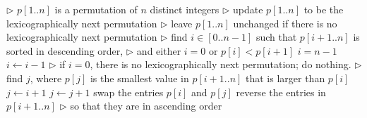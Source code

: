 \documentclass[11pt]{article}
\begin{document}
\begin{algorithmic}[1]
\State $\triangleright$ $p[1..n]$ is a permutation of $n$ distinct integers
\State $\triangleright$ update $p[1..n]$ to be the lexicographically next permutation
\State $\triangleright$ leave $p[1..n]$ unchanged if there is no lexicographically next permutation
\State
\State $\triangleright$ find $i \in [0..n- 1]$ such that $p[i + 1..n]$ is sorted in descending order,
\State $\triangleright$ and either $i=0$ or $p[i] < p[i+1]$
\State $i = n-1$
   \State $i \leftarrow i-1$
   \EndWhile
\State   
\State $\triangleright$ if $i=0$, there is no lexicographically next permutation; do nothing.
\State $\triangleright$ find $j$, where $p[j]$ is the smallest value in $p[i + 1..n]$ that is larger than $p[i]$
   \State $j \leftarrow i+1$
      \State $j \leftarrow j+1$
   \EndWhile
\State
   \State swap the entries $p[i]$ and $p[j]$
   \State reverse the entries in $p[i+1..n]$ \hspace{.3in} $\triangleright$ so that they are in ascending order
\EndIf
\EndProcedure
\end{algorithmic}
\end{document}
